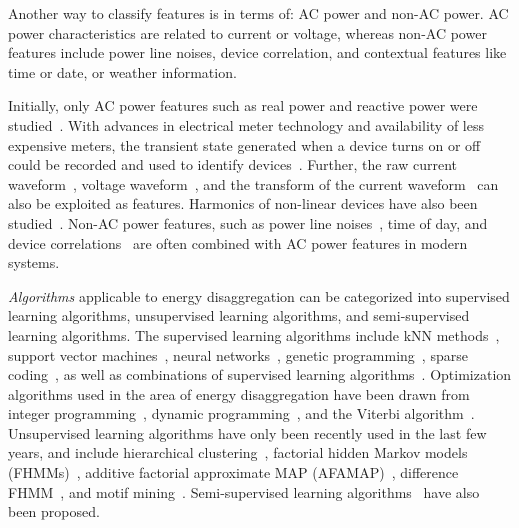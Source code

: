 Another way to classify features is in terms of:
AC power and non-AC power.
AC power characteristics are related to
current or voltage,
whereas non-AC power features include
power line noises, device correlation, and
contextual features like time or date, or weather information.

Initially, only
AC power features such as real power
and reactive power were studied~\cite{hart1992}.
With advances in electrical meter technology and availability of less expensive meters,
the transient state generated when a device turns on or off could be recorded and used
to identify devices~\cite{shaw2000PhdThesis}. 
Further, the raw current waveform~\cite{srinivasan2006neural}, voltage waveform~\cite{lam2007novel}, 
and the transform of the current waveform~\cite{chan2000harmonics}
can also be exploited as features.
Harmonics of non-linear devices
have also been studied~\cite{chan2000harmonics}.
Non-AC power features, such as power line noises~\cite{patel2007flick},
time of day, and device correlations~\cite{kim2011unsupervised}
are often combined with AC power features in modern systems. 

{\it Algorithms} applicable to energy disaggregation
can be categorized into supervised learning algorithms, 
unsupervised learning algorithms, and semi-supervised learning algorithms. 
The supervised learning algorithms include
kNN methods~\cite{shaw2000PhdThesis},
support vector machines~\cite{patel2007flick},
neural networks~\cite{roos1994using},
genetic programming~\cite{baranski2004genetic},
sparse coding~\cite{kolter2010sparse}, 
as well as
combinations of supervised learning algorithms~\cite{nakano2007non}. 
Optimization algorithms used in the area of energy disaggregation have
been drawn from integer programming~\cite{suzuki2008nonintrusive}, 
dynamic programming~\cite{baranski2004detecting}, and
the Viterbi algorithm~\cite {zeifman2011viterbi}.
Unsupervised learning algorithms
have only been recently used in
 the last few years, and include
hierarchical clustering~\cite{gonccalves2011unsupervised},
factorial hidden Markov models (FHMMs)~\cite{kim2011unsupervised},
additive factorial approximate MAP (AFAMAP)~\cite{kolter2012aistat}, 
difference FHMM~\cite{parson2012nonintrusive}, 
and motif mining~\cite{shao2013temporal}.
Semi-supervised learning 
algorithms~\cite{lam2007novel,johnson2012bayesian} have also
been proposed.


